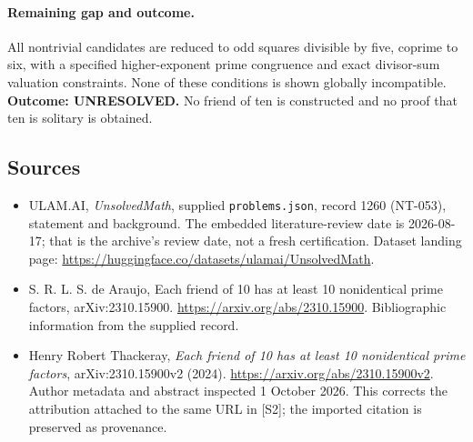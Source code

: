 \documentclass[11pt,a4paper]{article}
\begin{document}
\paragraph{Remaining gap and outcome.}
All nontrivial candidates are reduced to odd squares divisible by five,
coprime to six, with a specified higher-exponent prime congruence and
exact divisor-sum valuation constraints. None of these conditions is
shown globally incompatible. \textbf{Outcome: UNRESOLVED.} No friend
of ten is constructed and no proof that ten is solitary is obtained.

\subsection{Sources}

{\small

\begin{itemize}

\item[\hypertarget{source:1260:1}{S1}] ULAM.AI, \emph{UnsolvedMath}, supplied \texttt{problems.json}, record 1260 (NT-053), statement and background. The embedded literature-review date is 2026-08-17; that is the archive’s review date, not a fresh certification. Dataset landing page: \url{https://huggingface.co/datasets/ulamai/UnsolvedMath}.

\item[\hypertarget{source:1260:2}{S2}] S. R. L. S. de Araujo, Each friend of 10 has at least 10 nonidentical prime factors, arXiv:2310.15900. \url{https://arxiv.org/abs/2310.15900}. Bibliographic information from the supplied record.


\item[E1] Henry Robert Thackeray, \emph{Each friend of 10 has at
least 10 nonidentical prime factors}, arXiv:2310.15900v2 (2024).
\url{https://arxiv.org/abs/2310.15900v2}. Author metadata and abstract
inspected 1 October 2026. This corrects the attribution attached to the
same URL in [S2]; the imported citation is preserved as provenance.

\end{itemize}

}

\label{end:1260}
\end{document}
